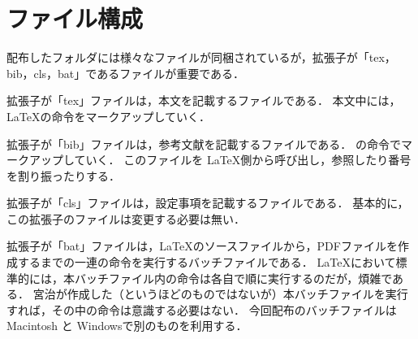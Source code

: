 \section{ファイル構成}
配布したフォルダには様々なファイルが同梱されているが，拡張子が「tex，bib，cls，bat」であるファイルが重要である．

拡張子が「tex」ファイルは，本文を記載するファイルである．
本文中には，\LaTeX の命令をマークアップしていく．

拡張子が「bib」ファイルは，参考文献を記載するファイルである．
\BibTeX の命令でマークアップしていく．
このファイルを \LaTeX 側から呼び出し，参照したり番号を割り振ったりする．

拡張子が「cls」ファイルは，設定事項を記載するファイルである．
基本的に，この拡張子のファイルは変更する必要は無い．

拡張子が「bat」ファイルは，\LaTeX のソースファイルから，PDFファイルを作成するまでの一連の命令を実行するバッチファイルである．
\LaTeX において標準的には，本バッチファイル内の命令は各自で順に実行するのだが，煩雑である．
宮治が作成した（というほどのものではないが）本バッチファイルを実行すれば，その中の命令は意識する必要はない．
今回配布のバッチファイルは Macintosh と Windowsで別のものを利用する．

